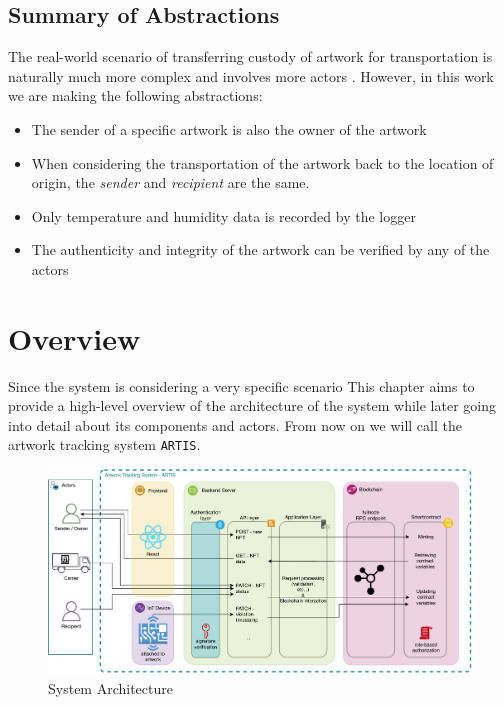 \subsection*{Summary of Abstractions}
The real-world scenario of transferring custody of artwork for transportation is naturally much more complex and involves more actors \cite{artintransit}. However, in this work we are making the following abstractions:
\begin{itemize}
    \item The sender of a specific artwork is also the owner of the artwork
    \item When considering the transportation of the artwork back to the location of origin, the \textit{sender} and \textit{recipient} are the same.
    \item Only temperature and humidity data is recorded by the logger
    \item The authenticity and integrity of the artwork can be verified by any of the actors
\end{itemize}



\section{Overview}
\label{sec:overview}
Since the system is considering a very specific scenario This chapter aims to provide a high-level overview of the architecture of the system while later going into detail about its components and actors. From now on we will call the artwork tracking system \texttt{ARTIS}.

\begin{figure}[ht]
    \centering
    \includegraphics[width=\textwidth, keepaspectratio]{diagrams/architecture.drawio.pdf}
    \caption{System Architecture}
    \label{fig:architecture}
\end{figure}

